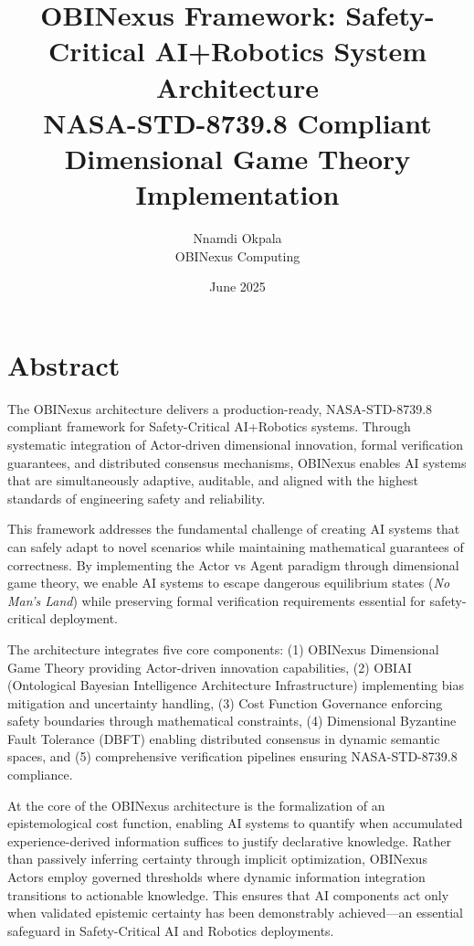 \documentclass[12pt,a4paper]{article}
\title{OBINexus Framework: Safety-Critical AI+Robotics System Architecture\\
\large NASA-STD-8739.8 Compliant Dimensional Game Theory Implementation}
\author{Nnamdi Okpala\\
OBINexus Computing}
\date{June 2025}
\begin{document}
\maketitle

\tableofcontents
\listoffigures
\listoftables

\clearpage

\section*{Abstract}

The OBINexus architecture delivers a production-ready, NASA-STD-8739.8 compliant framework for Safety-Critical AI+Robotics systems. Through systematic integration of Actor-driven dimensional innovation, formal verification guarantees, and distributed consensus mechanisms, OBINexus enables AI systems that are simultaneously adaptive, auditable, and aligned with the highest standards of engineering safety and reliability.

This framework addresses the fundamental challenge of creating AI systems that can safely adapt to novel scenarios while maintaining mathematical guarantees of correctness. By implementing the Actor vs Agent paradigm through dimensional game theory, we enable AI systems to escape dangerous equilibrium states (\textit{No Man's Land}) while preserving formal verification requirements essential for safety-critical deployment.

The architecture integrates five core components: (1) OBINexus Dimensional Game Theory providing Actor-driven innovation capabilities, (2) OBIAI (Ontological Bayesian Intelligence Architecture Infrastructure) implementing bias mitigation and uncertainty handling, (3) Cost Function Governance enforcing safety boundaries through mathematical constraints, (4) Dimensional Byzantine Fault Tolerance (DBFT) enabling distributed consensus in dynamic semantic spaces, and (5) comprehensive verification pipelines ensuring NASA-STD-8739.8 compliance.

At the core of the OBINexus architecture is the formalization of an epistemological cost function, enabling AI systems to quantify when accumulated experience-derived information suffices to justify declarative knowledge. Rather than passively inferring certainty through implicit optimization, OBINexus Actors employ governed thresholds where dynamic information integration transitions to actionable knowledge. This ensures that AI components act only when validated epistemic certainty has been demonstrably achieved—an essential safeguard in Safety-Critical AI and Robotics deployments.
\end{document}
